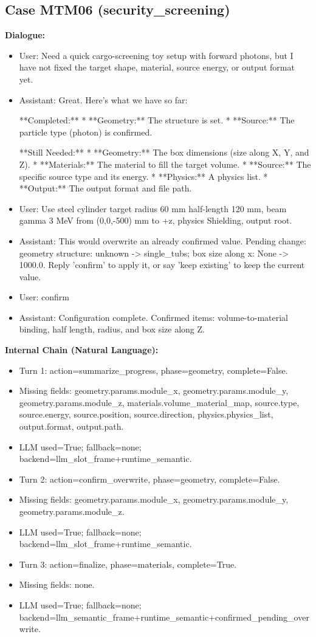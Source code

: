 \documentclass[11pt]{ctexart}
\begin{document}
\subsection{Case MTM06 (security\_screening)}
\textbf{Dialogue:}
\begin{itemize}
\item User: Need a quick cargo-screening toy setup with forward photons, but I have not fixed the target shape, material, source energy, or output format yet.
\item Assistant: Great. Here's what we have so far:

**Completed:**
*   **Geometry:** The structure is set.
*   **Source:** The particle type (photon) is confirmed.

**Still Needed:**
*   **Geometry:** The box dimensions (size along X, Y, and Z).
*   **Materials:** The material to fill the target volume.
*   **Source:** The specific source type and its energy.
*   **Physics:** A physics list.
*   **Output:** The output format and file path.
\item User: Use steel cylinder target radius 60 mm half-length 120 mm, beam gamma 3 MeV from (0,0,-500) mm to +z, physics Shielding, output root.
\item Assistant: This would overwrite an already confirmed value. Pending change: geometry structure: unknown -> single\_tubs; box size along x: None -> 1000.0. Reply 'confirm' to apply it, or say 'keep existing' to keep the current value.
\item User: confirm
\item Assistant: Configuration complete. Confirmed items: volume-to-material binding, half length, radius, and box size along Z.
\end{itemize}
\textbf{Internal Chain (Natural Language):}
\begin{itemize}
\item Turn 1: action=summarize\_progress, phase=geometry, complete=False.
\item Missing fields: geometry.params.module\_x, geometry.params.module\_y, geometry.params.module\_z, materials.volume\_material\_map, source.type, source.energy, source.position, source.direction, physics.physics\_list, output.format, output.path.
\item LLM used=True; fallback=none; backend=llm\_slot\_frame+runtime\_semantic.
\item Turn 2: action=confirm\_overwrite, phase=geometry, complete=False.
\item Missing fields: geometry.params.module\_x, geometry.params.module\_y, geometry.params.module\_z.
\item LLM used=True; fallback=none; backend=llm\_slot\_frame+runtime\_semantic.
\item Turn 3: action=finalize, phase=materials, complete=True.
\item Missing fields: none.
\item LLM used=True; fallback=none; backend=llm\_semantic\_frame+runtime\_semantic+confirmed\_pending\_overwrite.
\end{itemize}
\end{document}
